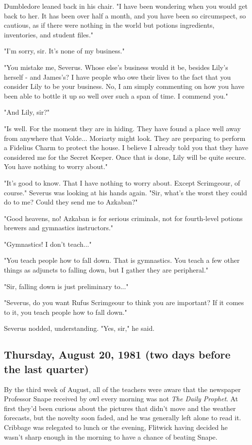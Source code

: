 Dumbledore leaned back in his chair. "I have been wondering when you would get back to her. It has been over half a month, and you have been so circumspect, so cautious, as if there were nothing in the world but potions ingredients, inventories, and student files."

"I'm sorry, sir. It's none of my business."

"You mistake me, Severus. Whose else's business would it be, besides Lily's herself - and James's? I have people who owe their lives to the fact that you consider Lily to be your business. No, I am simply commenting on how you have been able to bottle it up so well over such a span of time. I commend you."

"And Lily, sir?"

"Is well. For the moment they are in hiding. They have found a place well away from anywhere that Volde... Moriarty might look. They are preparing to perform a Fidelius Charm to protect the house. I believe I already told you that they have considered me for the Secret Keeper. Once that is done, Lily will be quite secure. You have nothing to worry about."

"It's good to know. That I have nothing to worry about. Except Scrimgeour, of course." Severus was looking at his hands again. "Sir, what's the worst they could do to me? Could they send me to Azkaban?"

"Good heavens, no! Azkaban is for serious criminals, not for fourth-level potions brewers and gymnastics instructors."

"Gymnastics! I don't teach..."

"You teach people how to fall down. That is gymnastics. You teach a few other things as adjuncts to falling down, but I gather they are peripheral."

"Sir, falling down is just preliminary to..."

"Severus, do you want Rufus Scrimgeour to think you are important? If it comes to it, you teach people how to fall down."

Severus nodded, understanding. "Yes, sir," he said.

\subsection{Thursday, August 20, 1981 (two days before the last quarter)}

By the third week of August, all of the teachers were aware that the newspaper Professor Snape received by owl every morning was not \emph{The Daily Prophet}. At first they'd been curious about the pictures that didn't move and the weather forecasts, but the novelty soon faded, and he was generally left alone to read it. Cribbage was relegated to lunch or the evening, Flitwick having decided he wasn't sharp enough in the morning to have a chance of beating Snape.

